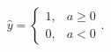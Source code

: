 \begin{equation}
    \hat{y} = \begin{cases} 1, & a \geq 0 \\ 0, & a < 0 \end{cases}.
    \label{eq:step}
\end{equation}